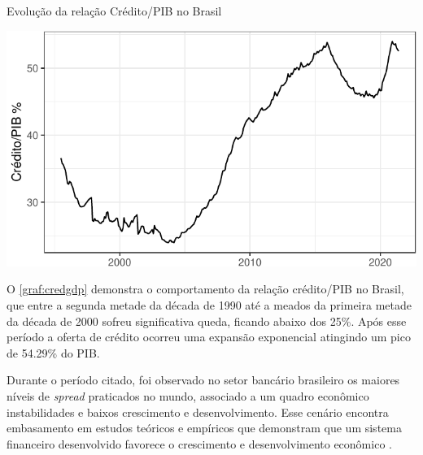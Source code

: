 \documentclass[
  12pt,
  12pt,
  openright,
  oneside,
  a4paper,
  chapter=TITLE,
  section=TITLE,
  subsection=TITLE,
  subsubsection=TITLE,
  english,
  portugues,
  sumario=tradicional]{abntex2}
\begin{document}
\begin{grafico}[!htb]
\vspace{20pt}
\caption{Evolução da relação Crédito/PIB no Brasil}
\vspace{-4mm}

\begin{center}\includegraphics{12-exportedfigures/credit.gdp-1} \end{center}
\vspace{-3mm}
\label{graf:credgdp}
\vspace{-2mm}
\end{grafico}

O \autoref{graf:credgdp} demonstra o comportamento da relação crédito/PIB no Brasil, que entre a segunda metade da década de 1990 até a meados da primeira metade da década de 2000 sofreu significativa queda, ficando abaixo dos 25\%. Após esse período a oferta de crédito ocorreu uma expansão exponencial atingindo um pico de 54.29\% do PIB.

Durante o período citado, foi observado no setor bancário brasileiro os maiores níveis de \emph{spread} praticados no mundo, associado a um quadro econômico instabilidades e baixos crescimento e desenvolvimento. Esse cenário encontra embasamento em estudos teóricos e empíricos que demonstram que um sistema financeiro desenvolvido favorece o crescimento e desenvolvimento econômico \cite{levine:1997, matos:2003}.
\end{document}
